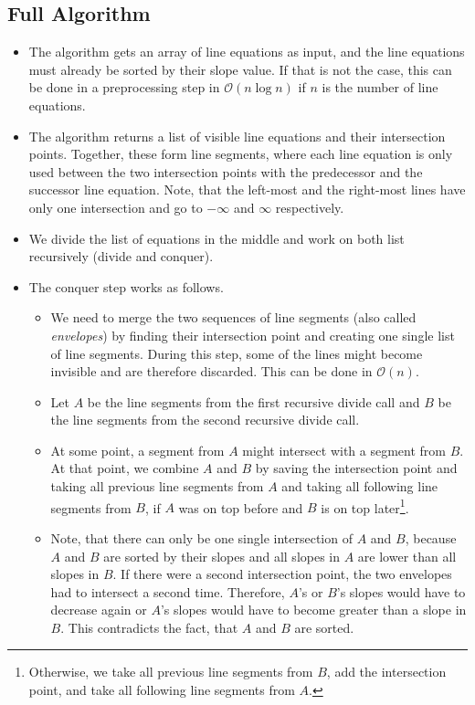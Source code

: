 \documentclass[12pt]{article}
\begin{document}
\subsection*{Full Algorithm}
\begin{itemize}
	\item The algorithm gets an array of line equations as input, and the line equations must already be sorted by their slope value. If that is not the case, this can be done in a preprocessing step in $\mathcal{O}(n \log n)$ if $n$ is the number of line equations.
	\item The algorithm returns a list of visible line equations and their intersection points. Together, these form line segments, where each line equation is only used between the two intersection points with the predecessor and the successor line equation. Note, that the left-most and the right-most lines have only one intersection and go to $-\infty$ and $\infty$ respectively.
	\item We divide the list of equations in the middle and work on both list recursively (divide and conquer).
	\item The conquer step works as follows. \begin{itemize}
		\item We need to merge the two sequences of line segments (also called \emph{envelopes}) by finding their intersection point and creating one single list of line segments. During this step, some of the lines might become invisible and are therefore discarded. This can be done in $\mathcal{O}(n)$.
		\item Let $A$ be the line segments from the first recursive divide call and $B$ be the line segments from the second recursive divide call.
		\item At some point, a segment from $A$ might intersect with a segment from $B$. At that point, we combine $A$ and $B$ by saving the intersection point and taking all previous line segments from $A$ and taking all following line segments from $B$, if $A$ was on top before and $B$ is on top later\footnote{Otherwise, we take all previous line segments from $B$, add the intersection point, and take all following line segments from $A$.}.
		\item Note, that there can only be one single intersection of $A$ and $B$, because $A$ and $B$ are sorted by their slopes and all slopes in $A$ are lower  than all slopes in $B$. If there were a second intersection point, the two envelopes had to intersect a second time. Therefore, $A$'s or $B$'s slopes would have to decrease again or $A$'s slopes would have to become greater than a slope in $B$. This contradicts the fact, that $A$ and $B$ are sorted.

\end{itemize}
\end{itemize}
\end{document}
